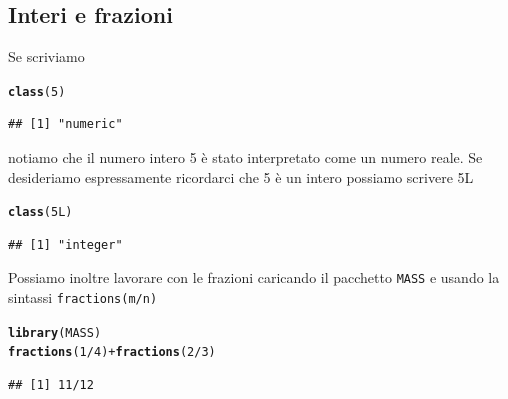 \documentclass[onecolumn,11pt]{book}\usepackage[]{graphicx}\usepackage[]{color}
\makeatletter
\newcommand{\hlnum}[1]{\textcolor[rgb]{0.686,0.059,0.569}{#1}}%
\newcommand{\hlopt}[1]{\textcolor[rgb]{0,0,0}{#1}}%
\newcommand{\hlstd}[1]{\textcolor[rgb]{0.345,0.345,0.345}{#1}}%
\newcommand{\hlkwd}[1]{\textcolor[rgb]{0.737,0.353,0.396}{\textbf{#1}}}%
\newenvironment{kframe}{%
 \def\at@end@of@kframe{}%
 \ifinner\ifhmode%
  \def\at@end@of@kframe{\end{minipage}}%
  \begin{minipage}{\columnwidth}%
 \fi\fi%
 \def\FrameCommand##1{\hskip\@totalleftmargin \hskip-\fboxsep
 \colorbox{shadecolor}{##1}\hskip-\fboxsep
     \hskip-\linewidth \hskip-\@totalleftmargin \hskip\columnwidth}%
 \MakeFramed {\advance\hsize-\width
   \@totalleftmargin\z@ \linewidth\hsize
   \@setminipage}}%
 {\par\unskip\endMakeFramed%
 \at@end@of@kframe}
\newenvironment{knitrout}{}{} %
\makeatother
\begin{document}
\subsection{Interi e frazioni}
Se scriviamo
\begin{knitrout}
\color{fgcolor}\begin{kframe}
\begin{alltt}
\hlkwd{class}\hlstd{(}\hlnum{5}\hlstd{)}
\end{alltt}
\begin{verbatim}
## [1] "numeric"
\end{verbatim}
\end{kframe}
\end{knitrout}
notiamo che il numero intero 5 \`e stato interpretato come un numero reale.
Se desideriamo espressamente ricordarci che  5 \`e  un  intero possiamo scrivere 5L
\begin{knitrout}
\color{fgcolor}\begin{kframe}
\begin{alltt}
\hlkwd{class}\hlstd{(}\hlnum{5L}\hlstd{)}
\end{alltt}
\begin{verbatim}
## [1] "integer"
\end{verbatim}
\end{kframe}
\end{knitrout}
Possiamo inoltre lavorare con le frazioni caricando il pacchetto \texttt{MASS} e usando la sintassi
\texttt{fractions(m/n)}
\begin{knitrout}
\color{fgcolor}\begin{kframe}
\begin{alltt}
\hlkwd{library}\hlstd{(MASS)}
\hlkwd{fractions}\hlstd{(}\hlnum{1}\hlopt{/}\hlnum{4}\hlstd{)}\hlopt{+}\hlkwd{fractions}\hlstd{(}\hlnum{2}\hlopt{/}\hlnum{3}\hlstd{)}
\end{alltt}
\begin{verbatim}
## [1] 11/12
\end{verbatim}
\end{kframe}
\end{knitrout}


\begin{knitrout}
\color{fgcolor}\begin{kframe}


{\ttfamily\noindent\itshape\color{messagecolor}{\#\# \\\#\# Attaching package: 'pracma'}}

{\ttfamily\noindent\itshape\color{messagecolor}{\#\# The following object is masked \_by\_ '.GlobalEnv':\\\#\# \\\#\#\ \ \ \  gcd}}\end{kframe}
\end{knitrout}

\end{document}
